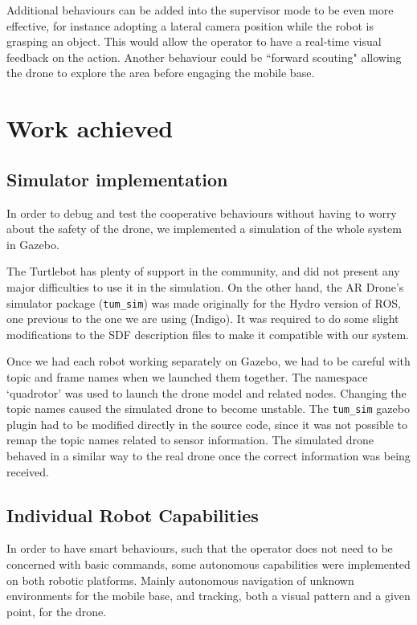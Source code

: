 \documentclass[11pt,a4paper]{article}
\begin{document}
Additional behaviours can be added into the supervisor mode to be even more effective, for
instance adopting a lateral camera position while the robot is grasping an object. This would
allow the operator to have a real-time visual feedback on the action. Another behaviour
could be ``forward scouting" allowing the drone to explore the area before engaging the 
mobile base.

\section{Work achieved}

\subsection{Simulator implementation}
In order to debug and test the cooperative behaviours without having to worry about the safety of the drone, we implemented a simulation of the whole system in Gazebo.

The Turtlebot has plenty of support in the community, and did not present any major difficulties to use it in the simulation. On the other hand, the AR Drone's simulator package (\verb!tum_sim!) was made originally for the Hydro version of ROS, one previous to the one we are using (Indigo). It was required to do some slight modifications to the SDF description files to make it compatible with our system.

Once we had each robot working separately on Gazebo, we had to be careful with topic and frame names when we launched them together. The namespace `quadrotor' was used to launch the drone model and related nodes. Changing the topic names caused the simulated drone to become unstable. The \verb!tum_sim! gazebo plugin had to be modified directly in the source code, since it was not possible to remap the topic names related to sensor information. The simulated drone behaved in a similar way to the real drone once the correct information was being received.

\subsection{Individual Robot Capabilities}
In order to have smart behaviours, such that the operator does not need to be concerned with basic commands, some autonomous capabilities were implemented on both robotic platforms. Mainly autonomous navigation of unknown environments for the mobile base, and tracking, both a visual pattern and a given point, for the drone.
\end{document}
